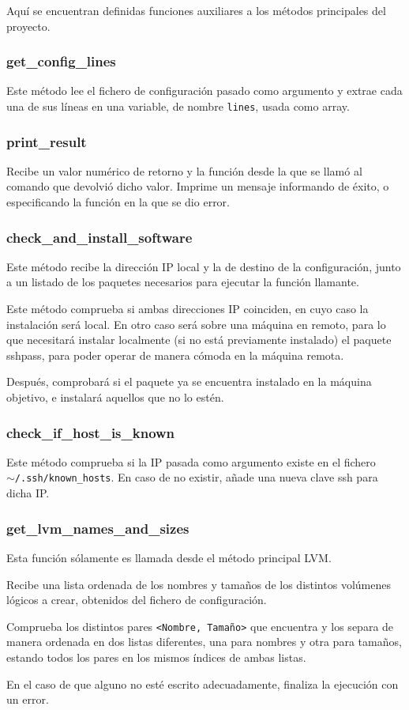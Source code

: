 Aquí se encuentran definidas funciones auxiliares a los métodos principales del proyecto.

\subsubsection{get\_config\_lines}
Este método lee el fichero de configuración pasado como argumento y extrae cada una de sus líneas en una variable, de nombre \texttt{lines}, usada como array.

\subsubsection{print\_result}
Recibe un valor numérico de retorno y la función desde la que se llamó al comando que devolvió dicho valor. Imprime un mensaje informando de éxito, o especificando la función en la que se dio error.

\subsubsection{check\_and\_install\_software}
Este método recibe la dirección IP local y la de destino de la configuración, junto a un listado de los paquetes necesarios para ejecutar la función llamante.

Este método comprueba si ambas direcciones IP coinciden, en cuyo caso la instalación será local. En otro caso será sobre una máquina en remoto, para lo que necesitará instalar localmente (si no está previamente instalado) el paquete sshpass, para poder operar de manera cómoda en la máquina remota.

Después, comprobará si el paquete ya se encuentra instalado en la máquina objetivo, e instalará aquellos que no lo estén.

\subsubsection{check\_if\_host\_is\_known}
Este método comprueba si la IP pasada como argumento existe en el fichero \\\texttt{\(\sim\)/.ssh/known\_hosts}. En caso de no existir, añade una nueva clave ssh para dicha IP.

\subsubsection{get\_lvm\_names\_and\_sizes}
Esta función sólamente es llamada desde el método principal LVM.

Recibe una lista ordenada de los nombres y tamaños de los distintos volúmenes lógicos a crear, obtenidos del fichero de configuración.

Comprueba los distintos pares \texttt{<Nombre, Tamaño>} que encuentra y los separa de manera ordenada en dos listas diferentes, una para nombres y otra para tamaños, estando todos los pares en los mismos índices de ambas listas.

En el caso de que alguno no esté escrito adecuadamente, finaliza la ejecución con un error.